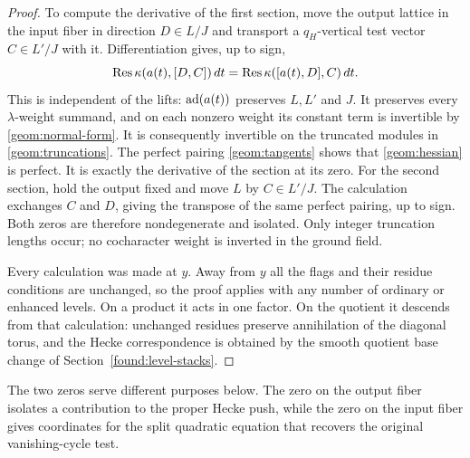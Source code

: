 \begin{proof}
To compute the derivative of the first section, move the output
lattice in the input fiber in direction $D\in L/J$ and transport a
$q_H$-vertical test vector $C\in L'/J$ with it.  Differentiation gives,
up to sign,
\begin{equation}\label{geom:hessian}
 \operatorname{Res}\kappa(a(t),[D,C])\,dt
                    =\operatorname{Res}\kappa([a(t),D],C)\,dt.
\end{equation}
This is independent of the lifts: $\operatorname{ad}(a(t))$ preserves $L,L'$ and
$J$.  It preserves every $\lambda$-weight summand, and on each nonzero
weight its constant term is invertible by \eqref{geom:normal-form}.
It is consequently invertible on the truncated modules in
\eqref{geom:truncations}.  The perfect pairing
\eqref{geom:tangents} shows that \eqref{geom:hessian} is perfect.
It is exactly the derivative of the section at its zero.  For the
second section, hold the output fixed and move $L$ by $C\in L'/J$.
The calculation exchanges $C$ and $D$, giving the transpose of the
same perfect pairing, up to sign.  Both zeros are therefore
nondegenerate and isolated.  Only integer truncation lengths occur;
no cocharacter weight is inverted in the ground field.

Every calculation was made at $y$.  Away from $y$ all the flags and
their residue conditions are unchanged, so the proof applies with any
number of ordinary or enhanced levels.  On a product it acts in one
factor.  On the quotient it descends from that calculation: unchanged
residues preserve annihilation of the diagonal torus, and the Hecke
correspondence is obtained by the smooth quotient base change of
Section~\ref{found:level-stacks}.
\end{proof}

The two zeros serve different purposes below.  The zero on the output
fiber isolates a contribution to the proper Hecke push, while the zero
on the input fiber gives coordinates for the split quadratic equation
that recovers the original vanishing-cycle test.
